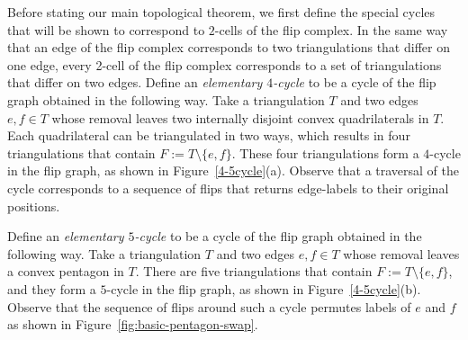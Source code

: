 %
%

Before stating our main topological theorem, we first define the special cycles that will be shown to correspond to $2$-cells of the flip complex. %
In the same way that an edge of the flip complex corresponds to two triangulations that differ on one edge, every 2-cell of the flip complex corresponds to a set of triangulations that differ on two edges.  
Define an \emph{elementary $4$-cycle} to be a cycle of the flip graph obtained in the following way.  Take a triangulation $T$ and two edges $e,f \in T$ whose removal leaves two internally disjoint convex quadrilaterals in $T$.  Each quadrilateral can be triangulated in two ways, which results in four triangulations that contain  $F:=T\setminus \{e,f\}$.  These four triangulations form a $4$-cycle in the flip graph, as shown in Figure~\ref{4-5cycle}(a).  Observe that a traversal of the cycle corresponds to a  sequence of flips that returns edge-labels to their original positions. 

Define an \emph{elementary $5$-cycle} to be a cycle of the flip graph obtained in the following way.  Take a triangulation $T$ and two edges $e,f \in T$ whose removal leaves a convex pentagon in $T$.  There are five triangulations that contain  $F:=T\setminus \{e,f\}$, and they form a $5$-cycle in the flip graph, as shown in Figure~\ref{4-5cycle}(b). Observe that the sequence of flips around such a cycle permutes labels of $e$ and $f$ as shown in Figure~\ref{fig:basic-pentagon-swap}.

